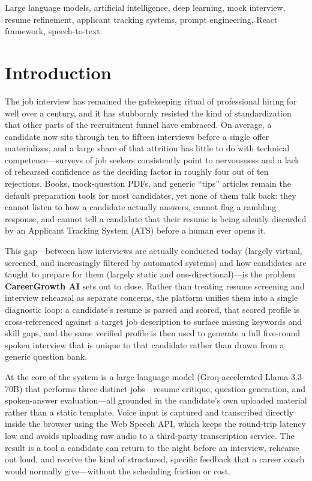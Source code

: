 \documentclass[conference]{IEEEtran}
\begin{document}
\begin{IEEEkeywords}
Large language models, artificial intelligence, deep learning, mock interview, resume refinement, applicant tracking systems, prompt engineering, React framework, speech-to-text.
\end{IEEEkeywords}

\section{Introduction}
The job interview has remained the gatekeeping ritual of professional hiring for well over a century, and it has stubbornly resisted the kind of standardization that other parts of the recruitment funnel have embraced. On average, a candidate now sits through ten to fifteen interviews before a single offer materializes, and a large share of that attrition has little to do with technical competence---surveys of job seekers consistently point to nervousness and a lack of rehearsed confidence as the deciding factor in roughly four out of ten rejections. Books, mock-question PDFs, and generic ``tips'' articles remain the default preparation tools for most candidates, yet none of them talk back: they cannot listen to how a candidate actually answers, cannot flag a rambling response, and cannot tell a candidate that their resume is being silently discarded by an Applicant Tracking System (ATS) before a human ever opens it.

This gap---between how interviews are actually conducted today (largely virtual, screened, and increasingly filtered by automated systems) and how candidates are taught to prepare for them (largely static and one-directional)---is the problem \textbf{CareerGrowth AI} sets out to close. Rather than treating resume screening and interview rehearsal as separate concerns, the platform unifies them into a single diagnostic loop: a candidate's resume is parsed and scored, that scored profile is cross-referenced against a target job description to surface missing keywords and skill gaps, and the same verified profile is then used to generate a full five-round spoken interview that is unique to that candidate rather than drawn from a generic question bank.

At the core of the system is a large language model (Groq-accelerated Llama-3.3-70B) that performs three distinct jobs---resume critique, question generation, and spoken-answer evaluation---all grounded in the candidate's own uploaded material rather than a static template. Voice input is captured and transcribed directly inside the browser using the Web Speech API, which keeps the round-trip latency low and avoids uploading raw audio to a third-party transcription service. The result is a tool a candidate can return to the night before an interview, rehearse out loud, and receive the kind of structured, specific feedback that a career coach would normally give---without the scheduling friction or cost.
\end{document}
